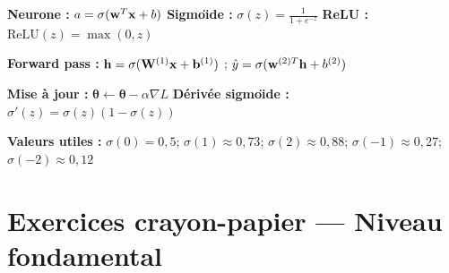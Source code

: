 %






\setlength{\parskip}{3pt}
\setlength{\abovedisplayskip}{6pt}
\setlength{\belowdisplayskip}{6pt}

\begin{tcolorbox}[
    enhanced, colback=ipssiCyan!5, colframe=ipssiCyan!50,
    boxrule=0.8pt, arc=4pt,
    title={\sffamily\bfseries Rappels --- Formules du Jour 4},
    coltitle=white, colbacktitle=ipssiCyan!70,
]
\small
\textbf{Neurone :}
$a = \sigma(\mathbf{w}^T\mathbf{x} + b)$
\hfill
\textbf{Sigmo\"{\i}de :}
$\sigma(z) = \frac{1}{1+e^{-z}}$
\hfill
\textbf{ReLU :}
$\text{ReLU}(z) = \max(0, z)$

\medskip
\textbf{Forward pass :}
$\mathbf{h} = \sigma(\mathbf{W}^{(1)}\mathbf{x} + \mathbf{b}^{(1)})$
\;;\;
$\hat{y} = \sigma(\mathbf{w}^{(2)T}\mathbf{h} + b^{(2)})$

\medskip
\textbf{Mise \`{a} jour :}
$\boldsymbol{\theta} \leftarrow \boldsymbol{\theta} - \alpha \nabla L$
\hfill
\textbf{D\'{e}riv\'{e}e sigmo\"{\i}de :} $\sigma'(z) = \sigma(z)(1-\sigma(z))$

\medskip
\textbf{Valeurs utiles :}
$\sigma(0) = 0{,}5$\;;\;
$\sigma(1) \approx 0{,}73$\;;\;
$\sigma(2) \approx 0{,}88$\;;\;
$\sigma(-1) \approx 0{,}27$\;;\;
$\sigma(-2) \approx 0{,}12$
\end{tcolorbox}

\section*{Exercices crayon-papier --- Niveau fondamental}


